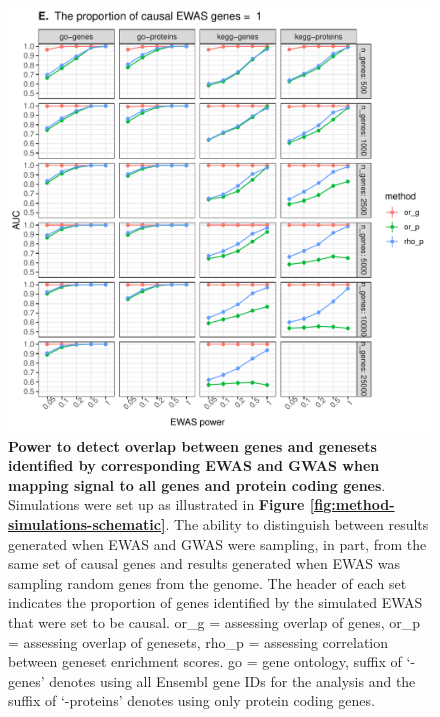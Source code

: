 \documentclass[11pt,twoside]{bristolthesis}
\begin{document}
\begin{figure}

{\centering \includegraphics[width=1\linewidth]{figure/06-ewas_gwas_comparison/method_test_gene_v_protein/PEC_1} 

}

\caption[Power to detect overlap between genes and genesets identified by corresponding EWAS and GWAS when mapping signal to all genes and protein coding genes]{\textbf{Power to detect overlap between genes and genesets identified by corresponding EWAS and GWAS when mapping signal to all genes and protein coding genes}. Simulations were set up as illustrated in \textbf{Figure \ref{fig:method-simulations-schematic}}. The ability to distinguish between results generated when EWAS and GWAS were sampling, in part, from the same set of causal genes and results generated when EWAS was sampling random genes from the genome. The header of each set indicates the proportion of genes identified by the simulated EWAS that were set to be causal. or\_g = assessing overlap of genes, or\_p = assessing overlap of genesets, rho\_p = assessing correlation between geneset enrichment scores. go = gene ontology, suffix of `-genes' denotes using all Ensembl gene IDs for the analysis and the suffix of `-proteins' denotes using only protein coding genes.}\label{fig:sim1-go-kegg-gene-comp5}
\end{figure}
\backmatter
\end{document}
